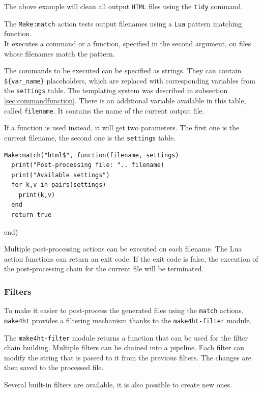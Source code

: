 The above example will clean all output \texttt{HTML} files using the
\texttt{tidy} command.

The \texttt{Make:match} action tests output filenames using a
\texttt{Lua} pattern matching function.\\
It executes a command or a function, specified in the second argument,
on files whose filenames match the pattern.

The commands to be executed can be specified as strings. They can
contain \texttt{\$\{var\_name\}} placeholders, which are replaced with
corresponding variables from the \texttt{settings} table. The templating
system was described in subsection \ref{sec:commandfunction}. There is
an additional variable available in this table, called
\texttt{filename}. It contains the name of the current output file.

If a function is used instead, it will get two parameters. The first one
is the current filename, the second one is the \texttt{settings} table.

\begin{verbatim}
Make:match("html$", function(filename, settings)
  print("Post-processing file: ".. filename)
  print("Available settings")
  for k,v in pairs(settings)
    print(k,v)
  end
  return true
\end{verbatim}

end)

Multiple post-processing actions can be executed on each filename. The
Lua action functions can return an exit code. If the exit code is false,
the execution of the post-processing chain for the current file will be
terminated.

\subsubsection{Filters}\label{filters}

\label{sec:filters}

To make it easier to post-process the generated files using the
\texttt{match} actions, \texttt{make4ht} provides a filtering mechanism
thanks to the \texttt{make4ht-filter} module.

The \texttt{make4ht-filter} module returns a function that can be used
for the filter chain building. Multiple filters can be chained into a
pipeline. Each filter can modify the string that is passed to it from
the previous filters. The changes are then saved to the processed file.

Several built-in filters are available, it is also possible to create
new ones.

